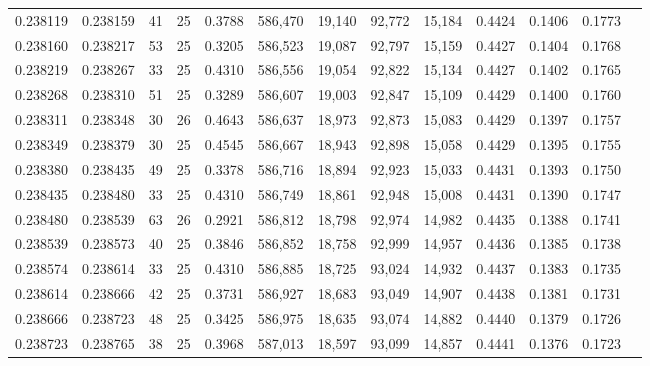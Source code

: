 \begin{tabular}{rrrrrrrrrrrrr}
0.238119 & 0.238159 &    41 &  25 &                                     0.3788 & 586,470 &  19,140 &  92,772 &  15,184 & 0.4424 & 0.1406 & 0.1773 \\
0.238160 & 0.238217 &    53 &  25 &                                     0.3205 & 586,523 &  19,087 &  92,797 &  15,159 & 0.4427 & 0.1404 & 0.1768 \\
0.238219 & 0.238267 &    33 &  25 &                                     0.4310 & 586,556 &  19,054 &  92,822 &  15,134 & 0.4427 & 0.1402 & 0.1765 \\
0.238268 & 0.238310 &    51 &  25 &                                     0.3289 & 586,607 &  19,003 &  92,847 &  15,109 & 0.4429 & 0.1400 & 0.1760 \\
0.238311 & 0.238348 &    30 &  26 &                                     0.4643 & 586,637 &  18,973 &  92,873 &  15,083 & 0.4429 & 0.1397 & 0.1757 \\
0.238349 & 0.238379 &    30 &  25 &                                     0.4545 & 586,667 &  18,943 &  92,898 &  15,058 & 0.4429 & 0.1395 & 0.1755 \\
0.238380 & 0.238435 &    49 &  25 &                                     0.3378 & 586,716 &  18,894 &  92,923 &  15,033 & 0.4431 & 0.1393 & 0.1750 \\
0.238435 & 0.238480 &    33 &  25 &                                     0.4310 & 586,749 &  18,861 &  92,948 &  15,008 & 0.4431 & 0.1390 & 0.1747 \\
0.238480 & 0.238539 &    63 &  26 &                                     0.2921 & 586,812 &  18,798 &  92,974 &  14,982 & 0.4435 & 0.1388 & 0.1741 \\
0.238539 & 0.238573 &    40 &  25 &                                     0.3846 & 586,852 &  18,758 &  92,999 &  14,957 & 0.4436 & 0.1385 & 0.1738 \\
0.238574 & 0.238614 &    33 &  25 &                                     0.4310 & 586,885 &  18,725 &  93,024 &  14,932 & 0.4437 & 0.1383 & 0.1735 \\
0.238614 & 0.238666 &    42 &  25 &                                     0.3731 & 586,927 &  18,683 &  93,049 &  14,907 & 0.4438 & 0.1381 & 0.1731 \\
0.238666 & 0.238723 &    48 &  25 &                                     0.3425 & 586,975 &  18,635 &  93,074 &  14,882 & 0.4440 & 0.1379 & 0.1726 \\
0.238723 & 0.238765 &    38 &  25 &                                     0.3968 & 587,013 &  18,597 &  93,099 &  14,857 & 0.4441 & 0.1376 & 0.1723 \\

\end{tabular}
